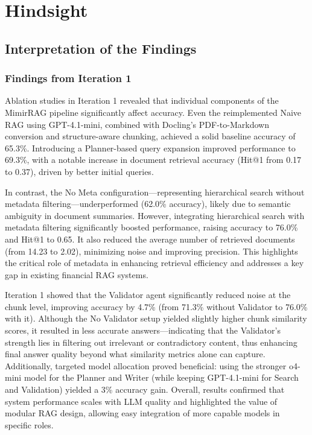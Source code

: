 \documentclass[final,5p,times,twopage,twocolumn,a4paper]{elsarticle}
\begin{document}
\section{Hindsight}
\label{chap:discussion}
\subsection{Interpretation of the Findings}
\label{sec:discussion:interpretation}

\subsubsection{Findings from Iteration 1}
Ablation studies in Iteration 1 revealed that individual components of the MimirRAG pipeline significantly affect accuracy. Even the reimplemented Naive RAG using GPT-4.1-mini, combined with Docling's PDF-to-Markdown conversion and structure-aware chunking, achieved a solid baseline accuracy of 65.3\%. Introducing a Planner-based query expansion improved performance to 69.3\%, with a notable increase in document retrieval accuracy (Hit@1 from 0.17 to 0.37), driven by better initial queries.

In contrast, the No Meta configuration—representing hierarchical search without metadata filtering—underperformed (62.0\% accuracy), likely due to semantic ambiguity in document summaries. However, integrating hierarchical search with metadata filtering significantly boosted performance, raising accuracy to 76.0\% and Hit@1 to 0.65. It also reduced the average number of retrieved documents (from 14.23 to 2.02), minimizing noise and improving precision. This highlights the critical role of metadata in enhancing retrieval efficiency and addresses a key gap in existing financial RAG systems.

Iteration 1 showed that the Validator agent significantly reduced noise at the chunk level, improving accuracy by 4.7\% (from 71.3\% without Validator to 76.0\% with it). Although the No Validator setup yielded slightly higher chunk similarity scores, it resulted in less accurate answers—indicating that the Validator's strength lies in filtering out irrelevant or contradictory content, thus enhancing final answer quality beyond what similarity metrics alone can capture. Additionally, targeted model allocation proved beneficial: using the stronger o4-mini model for the Planner and Writer (while keeping GPT-4.1-mini for Search and Validation) yielded a 3\% accuracy gain. Overall, results confirmed that system performance scales with LLM quality and highlighted the value of modular RAG design, allowing easy integration of more capable models in specific roles.
\end{document}
